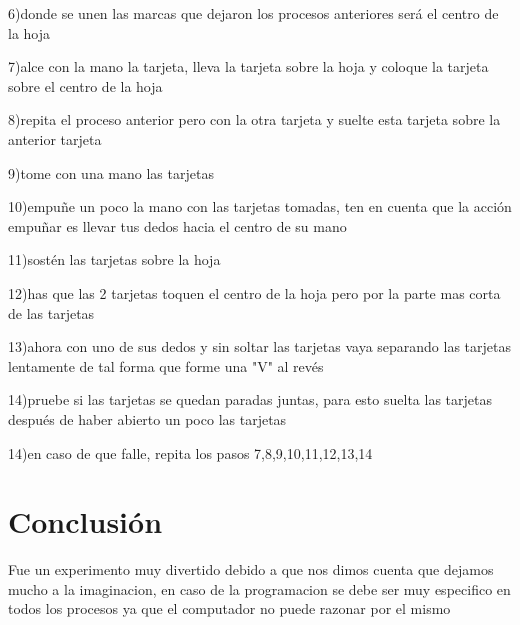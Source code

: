 \documentclass{article}
\begin{document}
6)donde se unen las marcas que dejaron los procesos anteriores será el centro de la hoja

7)alce con la mano la tarjeta, lleva la tarjeta sobre la hoja y coloque la tarjeta sobre el centro de la hoja 

8)repita el proceso anterior pero con la otra tarjeta y suelte esta tarjeta sobre la anterior tarjeta

9)tome con una mano las tarjetas

10)empuñe un poco la mano con las tarjetas tomadas, ten en cuenta que la acción empuñar es llevar tus dedos hacia el centro de su mano

11)sostén las tarjetas sobre la hoja

12)has que las 2 tarjetas toquen el centro de la hoja pero por la parte mas corta de las tarjetas

13)ahora con uno de sus dedos y sin soltar las tarjetas vaya separando las tarjetas lentamente de tal forma que forme una "V"  al revés

14)pruebe si las tarjetas se quedan paradas juntas, para esto suelta las tarjetas después de haber abierto un poco las tarjetas 

14)en caso de que falle, repita los pasos 7,8,9,10,11,12,13,14



\section{Conclusión} \label{conclulsion}
Fue un experimento muy divertido debido a que nos dimos cuenta que dejamos mucho a la imaginacion, en caso de la programacion se debe ser muy especifico en todos los procesos ya que el computador no puede razonar por el mismo
\end{document}
